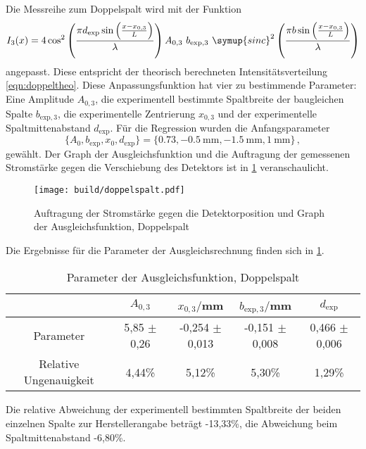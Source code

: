 Die Messreihe zum Doppelspalt wird mit der Funktion
\begin{equation}
  I_3 (x) = 4 \cos^2\left(\frac{\pi d_\text{exp} \sin\left(\frac{x-x_{0,3}}{L}\right)}{\lambda}\right) A_{0,3} \,\, b_{\text{exp},3} \,\,
  \symup{sinc}^2\left(\frac{\pi b \sin\left(\frac{x-x_{0,3}}{L}\right)}{\lambda}\right)
\end{equation}
angepasst. Diese entspricht der theorisch berechneten Intensitätsverteilung \eqref{eqn:doppeltheo}.
Diese Anpassungsfunktion hat vier zu bestimmende Parameter: Eine Amplitude $A_{0,3}$,
die experimentell bestimmte Spaltbreite der baugleichen Spalte $b_{\text{exp},3}$,
die experimentelle Zentrierung $x_{0,3}$ und der experimentelle Spaltmittenabstand
$d_\text{exp}$.
Für die Regression wurden die Anfangsparameter
\begin{equation}
  \{A_0, b_{\text{exp}}, x_0, d_\text{exp}\} = \{0.73, \SI{-0.5}{\milli\meter}, \SI{-1.5}{\milli\meter}, \SI{1}{\milli\meter}\}\,,
\end{equation}
gewählt.
Der Graph der Ausgleichsfunktion und die Auftragung der gemessenen Stromstärke gegen
die Verschiebung des Detektors ist in \ref{fig:spalt3} veranschaulicht.

\begin{figure}
  \centering
  \texttt{[image: build/doppelspalt.pdf]}
  \caption{Auftragung der Stromstärke gegen die Detektorposition und Graph der Ausgleichsfunktion, Doppelspalt}
  \label{fig:spalt3}
\end{figure}

Die Ergebnisse für die Parameter der Ausgleichsrechnung finden sich in \ref{tab:paramsdoppel}.

\begin{table}
\centering
\begin{tabular}{ccccc}
\toprule
& $A_{0,3}$ & $x_{0,3}/$mm & $b_{\text{exp},3}/$mm & $d_\text{exp}$ \\
\midrule
Parameter & 5,85 $\pm$ 0,26 & -0,254 $\pm$ 0,013 & -0,151 $\pm$ 0,008 & 0,466 $\pm$ 0,006 \\
Relative Ungenauigkeit & 4,44\% & 5,12\% & 5,30\% & 1,29\%\\
\bottomrule
\end{tabular}
\caption{Parameter der Ausgleichsfunktion, Doppelspalt}
\label{tab:paramsdoppel}
\end{table}

Die relative Abweichung der experimentell bestimmten Spaltbreite der beiden einzelnen
Spalte zur Herstellerangabe beträgt -13,33\%, die Abweichung beim Spaltmittenabstand
-6,80\%.

